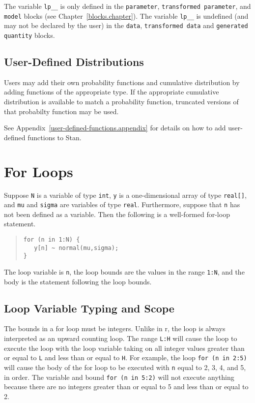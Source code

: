 \documentclass[10pt]{report}
\newcommand{\Stan}{Stan\xspace}
\newcommand{\acronym}[1]{{\sc #1}\xspace}
\newcommand{\R}{\acronym{r}}
\newcommand{\code}[1]{{\tt #1}}
\newcommand{\refappendix}[1]{Appendix~\ref{#1.appendix}}
\newcommand{\refchapter}[1]{Chapter~\ref{#1.chapter}}
\begin{document}
The variable \code{lp\_\_} is only defined in the \code{parameter},
\code{transformed parameter}, and \code{model} blocks (see
\refchapter{blocks}).  The variable \code{lp\_\_} is undefined (and
may not be declared by the user) in the \code{data}, \code{transformed
  data} and \code{generated quantity} blocks.

\subsection{User-Defined Distributions}

Users may add their own probability functions and cumulative
distribution by adding functions of the appropriate type.  If the
appropriate cumulative distribution is available to match a
probability function, truncated versions of that probabilty function
may be used. 

See \refappendix{user-defined-functions} for details on how to add
user-defined functions to \Stan.


\section{For Loops}

Suppose
\code{N} is a variable of type \code{int}, \code{y} is a
one-dimensional array of type \code{real[]}, and \code{mu} and
\code{sigma} are variables of type \code{real}.  Furthermore, suppose
that \code{n} has not been defined as a variable. Then the following
is a well-formed for-loop statement.
%
\begin{quote}
\begin{Verbatim}
for (n in 1:N) {
   y[n] ~ normal(mu,sigma);
}
\end{Verbatim}
\end{quote}
%
The loop variable is \code{n}, the loop bounds are the values in the
range \code{1:N}, and the body is the statement following the
loop bounds.  

\subsection{Loop Variable Typing and Scope}

The bounds in a for loop must be integers.  Unlike in \R, the loop is
always interpreted as an upward counting loop.  The range \code{L:H}
will cause the loop to execute the loop with the loop variable taking
on all integer values greater than or equal to \code{L} and less than
or equal to \code{H}.  For example, the loop \code{for (n in 2:5)}
will cause the body of the for loop to be executed with \code{n} equal
to 2, 3, 4, and 5, in order.  The variable and bound \code{for (n in
  5:2)} will not execute anything because there are no integers
greater than or equal to 5 and less than or equal to 2.
\end{document}
